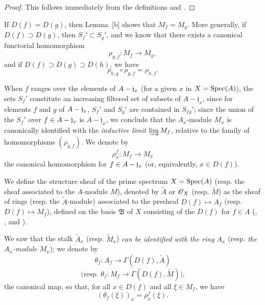 \begin{proof}
\label{proof-I.1.3.2}
This follows immediately from the definitions and .
\end{proof}

\begin{env}[1.3.3]
\label{I.1.3.3}
If $D(f)=D(g)$, then Lemma~[b] shows that $M_f=M_g$.
More generally, if $D(f)\supset D(g)$, then $S_f'\subset S_g'$, and we know  that there exists a canonical functorial homomorphism
\[
  \rho_{g,f}:M_f\to M_g,
\]
and if $D(f)\supset D(g)\supset D(h)$, we have 
\[
  \rho_{h,g}\circ\rho_{g,f}=\rho_{h,f}.
  \tag{1.3.3.1}
\]
\end{env}

When $f$ ranges over the elements of $A-\mathfrak{j}_x$ (for a given $x$ in $X=\operatorname{Spec}(A)$), the sets $S_f'$ constitute an increasing filtered set of subsets of $A-\mathfrak{j}_x$, since for elements $f$ and $g$ of $A-\mathfrak{j}_x$, $S_f'$ and $S_g'$ are contained in $S_{fg}'$;
since the union of the $S_f'$ over $f\in A-\mathfrak{j}_x$ is $A-\mathfrak{j}_x$, we conclude  that the $A_x$-module $M_x$ is canonically identified with the \emph{inductive limit} $\varinjlim M_f$, relative to the family of homomorphisms $(\rho_{g,f})$.
We denote by
\[
  \rho_x^f:M_f\to M_x
\]
the canonical homomorphism for $f\in A-\mathfrak{j}_x$ (or, equivalently, $x\in D(f)$).

\begin{definition}[1.3.4]
\label{I.1.3.4}
We define the structure sheaf of the prime spectrum $X=\operatorname{Spec}(A)$ (resp. the sheaf associated to the $A$-module $M$), denoted by $\widetilde{A}$ or $\mathscr{O}_X$ (resp. $\widetilde{M}$) as the sheaf of rings (resp. the $\widetilde{A}$-module) associated to the presheaf $D(f)\mapsto A_f$ (resp. $D(f)\mapsto M_f$), defined on the basis $\mathfrak{B}$ of $X$ consisting of the $D(f)$ for $f\in A$ (, , and ).
\end{definition}

We saw  that the stalk $\widetilde{A}_x$ (resp. $\widetilde{M}_x$) \emph{can be identified with the ring $A_x$} (resp. \emph{the $A_x$-module $M_x$});
we denote by
\[
  \theta_f:A_f\to\Gamma(D(f),\widetilde{A})
\]
\[
  \text{(resp. }\theta_f:M_f\to\Gamma(D(f),\widetilde{M})\text{),}
\]
the canonical map, so that, for all $x\in D(f)$ and all $\xi\in M_f$, we have
\[
  (\theta_f(\xi))_x=\rho_x^f(\xi).
  \tag{1.3.4.1}
\]

